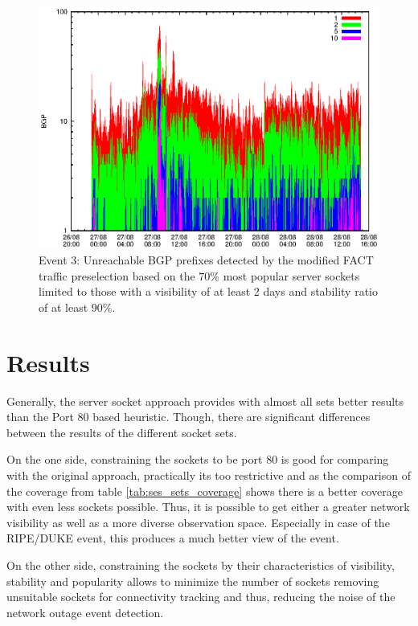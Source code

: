 \begin{figure}
	[p] \centering 
	\includegraphics[width=0.75\linewidth]{images/events/2010_08_27/bgp_log_Set_var_0_1_stab_9_vts_2.eps} \caption{Event 3: Unreachable BGP prefixes detected by the modified FACT traffic preselection based on the $70\%$ most popular server sockets limited to those with a visibility of at least 2 days and stability ratio of at least $90\%$.} 
	\label{fig:RIPE_FACT_popularVTS2STAB9} 
\end{figure}

\newpage 
\section{Results} Generally, the server socket approach provides with almost all 
sets better results than the Port 80 based heuristic. Though, there are 
significant differences between the results of the different socket sets. 

On the one side, constraining the sockets to be port 80 is good for comparing 
with the original approach, practically its too restrictive and as the 
comparison of the coverage from table \ref{tab:ses_sets_coverage} shows there is 
a better coverage with even less sockets possible. Thus, it is possible to get either a greater network visibility as well as a more diverse observation space. Especially in case of the RIPE/DUKE event, this produces a much better view of the event.  

On the other side, constraining the sockets by their characteristics of 
visibility, stability and popularity allows to minimize the number of sockets 
removing unsuitable sockets for connectivity tracking and thus, reducing the 
noise of the network outage event detection.

